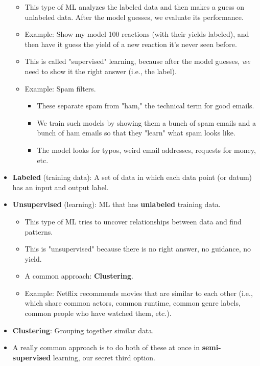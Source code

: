 \documentclass[../notes.tex]{subfiles}
\begin{document}
\begin{itemize}
    \begin{itemize}
        \item This type of ML analyzes the labeled data and then makes a guess on unlabeled data. After the model guesses, we evaluate its performance.
        \item Example: Show my model 100 reactions (with their yields labeled), and then have it guess the yield of a new reaction it's never seen before.
        \item This is called "supervised" learning, because after the model guesses, \emph{we} need to show it the right answer (i.e., the label).
        \item Example: Spam filters.
        \begin{itemize}
            \item These separate spam from "ham," the technical term for good emails.
            \item We train such models by showing them a bunch of spam emails and a bunch of ham emails so that they "learn" what spam looks like.
            \item The model looks for typos, weird email addresses, requests for money, etc.
        \end{itemize}
    \end{itemize}
    \item \textbf{Labeled} (training data): A set of data in which each data point (or datum) has an input and output label.
    \item \textbf{Unsupervised} (learning): ML that has \textbf{unlabeled} training data.
    \begin{itemize}
        \item This type of ML tries to uncover relationships between data and find patterns.
        \item This is "unsupervised" because there is no right answer, no guidance, no yield.
        \item A common approach: \textbf{Clustering}.
        \item Example: Netflix recommends movies that are similar to each other (i.e., which share common actors, common runtime, common genre labels, common people who have watched them, etc.).
    \end{itemize}
    \item \textbf{Clustering}: Grouping together similar data.
    \item A really common approach is to do both of these at once in \textbf{semi-supervised} learning, our secret third option.

\end{itemize}
\end{document}
